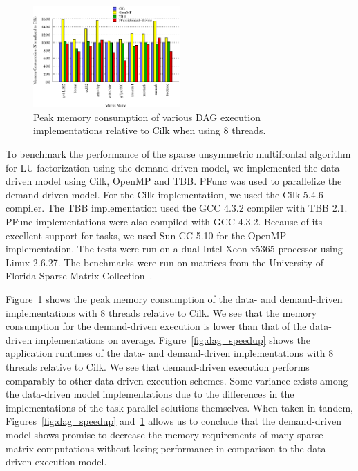 \documentclass{sig-alternate}
\begin{document}
\begin{figure}[t]
\includegraphics[width=0.5\textwidth]{dagresults/dag_memory}
\caption{Peak memory consumption of various DAG execution implementations 
relative to Cilk when using 8 threads.}
\label{fig:dag_memory}
\end{figure}

To benchmark the performance of the sparse unsymmetric multifrontal algorithm
for LU factorization using the demand-driven model, we implemented the
data-driven model using Cilk, OpenMP and TBB. PFunc was used to parallelize
the demand-driven model.  For the Cilk implementation, we used the Cilk 5.4.6
compiler.  The TBB implementation used the GCC 4.3.2 compiler with TBB 2.1.
PFunc implementations were also compiled with GCC 4.3.2. Because of its
excellent support for tasks, we used Sun CC 5.10 for the OpenMP
implementation. 
%
The tests were run on a dual Intel Xeon x5365 processor using Linux 2.6.27. The
benchmarks were run on matrices from the University of Florida Sparse Matrix
Collection~\cite{davissparse}.

Figure~\ref{fig:dag_memory} shows the peak memory consumption of the data- and
demand-driven implementations with 8 threads relative to Cilk.  We see that the
memory consumption for the demand-driven execution is lower than that of the
data-driven implementations on average.  Figure~\ref{fig:dag_speedup} shows the
application runtimes of the data- and demand-driven implementations with 8
threads relative to Cilk.  We see that demand-driven execution performs
comparably to other data-driven execution schemes. Some variance exists among
the data-driven model implementations due to the differences in the
implementations of the task parallel solutions themselves. 
When taken in tandem, Figures~\ref{fig:dag_speedup} and~\ref{fig:dag_memory}
allows us to conclude that the demand-driven model shows promise to decrease
the memory requirements of many sparse matrix computations without losing
performance in comparison to the data-driven execution model. 
\end{document}
